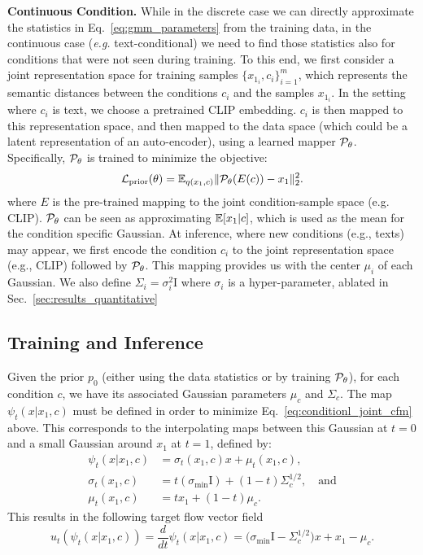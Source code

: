 \noindent \textbf{Continuous Condition.} \quad
While in the discrete case we can directly approximate the statistics in Eq.~\ref{eq:gmm_parameters} from the training data, in the continuous case (\emph{e.g.} text-conditional) we need to find those statistics also for conditions that were not seen during training. To this end, we first consider a joint representation space for training samples $\{x_{1_i}, c_i\}_{i=1}^m$, which represents the semantic distances between the conditions $c_i$ and the samples $x_{1_i}$. In the setting where $c_i$ is text, we choose a pretrained CLIP embedding. 
$c_i$ is then mapped to this representation space, and then mapped to the 
data space (which could be a latent representation of an auto-encoder), using a learned mapper ${\mathcal{P}}_\theta$. 
Specifically, ${\mathcal{P}}_\theta$ is trained to minimize the objective:
\begin{equation}
    {\mathcal{L}}_{\rm prior}(\theta) = \mathbb{E}_{q(x_1,c)} \|{\mathcal{P}}_\theta(E(c)) - x_1\|^2_2.
\end{equation}
where $E$ is the pre-trained mapping to the joint condition-sample space (e.g. CLIP). ${\mathcal{P}}_\theta$ can be seen as approximating $\mathbb{E}[x_1|c]$, which is used as the mean for the condition specific Gaussian.  
At inference, where new conditions (e.g., texts) may appear, we first encode the condition $c_i$ to the joint representation space (e.g., CLIP) followed by ${\mathcal{P}}_\theta$. This mapping provides us with the center $\mu_i$ of each Gaussian. %
We also define $\Sigma_i = \sigma_i^2\mathrm{I}$ where $\sigma_i$ is a hyper-parameter, ablated in Sec.~\ref{sec:results_quantitative} 

\subsection{Training and Inference}

Given the prior $p_0$ (either using the data statistics or by training ${\mathcal{P}}_\theta$), for each condition $c$, we have its associated Gaussian parameters $\mu_c$ and $\Sigma_c$. The map $\psi_t(x|x_1,c)$ must be defined in order to minimize Eq.~\ref{eq:conditionl_joint_cfm} above. This corresponds to the interpolating maps between this Gaussian at $t=0$ and a small Gaussian around $x_1$ at $t=1$, defined by:
\begin{align}
    \psi_{t}(x|x_1,c) &= \sigma_t(x_1,c)x + \mu_t(x_1,c), \\ 
    \sigma_t(x_1,c) &= t (\sigma_{\min} \mathrm{I}) + (1-t)\Sigma_{c}^{1/2}, \quad \text{and} \\
    \mu_t(x_1,c) &= t x_1 + (1-t) \mu_c.
\end{align}
This results in the following target flow vector field 
\begin{equation*}
    u_t(\psi_{t}(x|x_1,c)) = \frac{d}{dt}\psi_t (x|x_1,c)  =   \big(\sigma_{\min}  \mathrm{I} - \Sigma_c^{1/2}\big)x +  x_1 - \mu_c.
\end{equation*}


